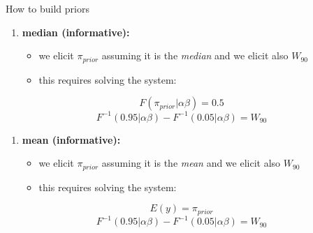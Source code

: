 \documentclass{beamer}
\begin{document}
\begin{frame}{How to build priors}

\begin{enumerate}
\def\labelenumi{\arabic{enumi}.}
\setcounter{enumi}{2}
\item
  \textbf{median (informative):}

  \begin{itemize}
  \itemsep1pt\parskip0pt
  \item
    we elicit \(\pi_{prior}\) assuming it is the \emph{median} and we
    elicit also \(W_{90}\)
  \item
    this requires solving the system:
  \end{itemize}
\end{enumerate}

$$
F(\pi_{prior}\vert \alpha\beta) =0.5 
$$
$$
F^{-1}(0.95\vert \alpha\beta) -F^{-1}(0.05\vert \alpha\beta) = W_{90} 
$$


\begin{enumerate}
\def\labelenumi{\arabic{enumi}.}
\setcounter{enumi}{3}
\item
  \textbf{mean (informative):}

  \begin{itemize}
  \itemsep1pt\parskip0pt
  \item
    we elicit \(\pi_{prior}\) assuming it is the \emph{mean} and we
    elicit also \(W_{90}\)
  \item
    this requires solving the system:
  \end{itemize}
\end{enumerate}

$$
E(y)=\pi_{prior} 
$$
$$
F^{-1}(0.95\vert \alpha\beta) -F^{-1}(0.05\vert \alpha\beta) = W_{90} 
$$

\end{frame}
\end{document}
